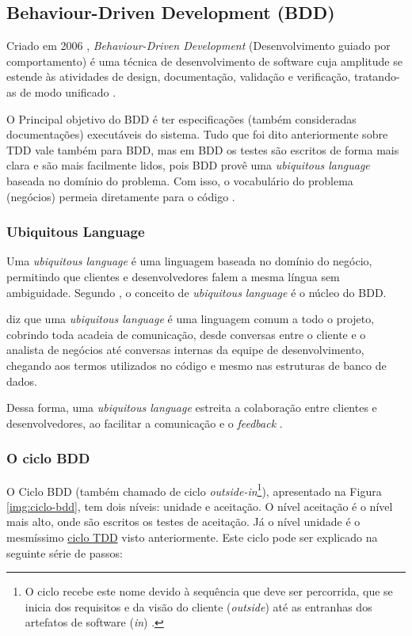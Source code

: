 \subsection{Behaviour-Driven Development (BDD)}
\label{subsec:bdd}

Criado em 2006 \cite{IntroducingBDD}, \textit{Behaviour-Driven Development} (Desenvolvimento guiado por comportamento) é uma técnica de desenvolvimento de software cuja amplitude se estende às atividades de design, documentação, validação e verificação, tratando-as de modo unificado \cite{BDDRodrigo}.

O Principal objetivo do BDD é ter especificações (também consideradas documentações) executáveis do sistema. Tudo que foi dito anteriormente sobre TDD vale também para BDD, mas em BDD os testes são escritos de forma mais clara e são mais facilmente lidos, pois BDD provê uma \textit{ubiquitous language} baseada no domínio do problema. Com isso, o vocabulário do problema (negócios) permeia diretamente para o código \cite{IntroducingBDD}.

\subsubsection{Ubiquitous Language}
\label{ssub:ubiquitous_language}

Uma \textit{ubiquitous language} é uma linguagem baseada no domínio do negócio, permitindo que clientes e desenvolvedores falem a mesma língua sem ambiguidade. Segundo , o conceito de \textit{ubiquitous language} é o núcleo do BDD.


 diz que uma \textit{ubiquitous language} é uma linguagem comum a todo o projeto, cobrindo toda acadeia de comunicação, desde conversas entre o cliente e o analista de negócios até conversas internas da equipe de desenvolvimento, chegando aos termos utilizados no código e mesmo nas estruturas de banco de dados.

Dessa forma, uma \textit{ubiquitous language} estreita a colaboração entre clientes e desenvolvedores, ao facilitar a comunicação e o \textit{feedback} \cite{DDD}.

\subsubsection{O ciclo BDD}
\label{ssub:o_ciclo_bdd}

O Ciclo BDD (também chamado de ciclo \textit{outside-in}\footnote{O ciclo recebe este nome devido à sequência que deve ser percorrida, que se inicia dos requisitos e da visão do cliente (\textit{outside}) até as entranhas dos artefatos de software (\textit{in}) \cite{BDDRodrigo}.}), apresentado na Figura \ref{img:ciclo-bdd}, tem dois níveis: unidade e aceitação. O nível aceitação é o nível mais alto, onde são escritos os testes de aceitação. Já o nível unidade é o mesmíssimo \hyperref[ssub:ciclo_tdd]{ciclo TDD} visto anteriormente. Este ciclo pode ser explicado na seguinte série de passos:

